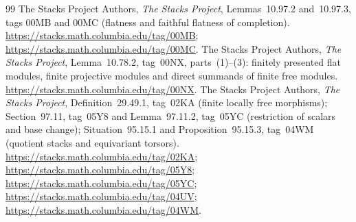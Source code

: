 \documentclass[11pt,a4paper]{article}
\theoremstyle{named}\newtheorem{finding}{Finding}[section]
\theoremstyle{definition}\newtheorem{definition}[finding]{Definition}
\theoremstyle{remark}\newtheorem{remark}[finding]{Remark}
\begin{document}
\begin{thebibliography}{99}
 The Stacks Project Authors,
\emph{The Stacks Project},
Lemmas~10.97.2 and~10.97.3, tags 00MB and 00MC
(flatness and faithful flatness of completion).
\url{https://stacks.math.columbia.edu/tag/00MB};
\url{https://stacks.math.columbia.edu/tag/00MC}.
 The Stacks Project Authors,
\emph{The Stacks Project}, Lemma~10.78.2, tag~00NX,
parts~(1)--(3): finitely presented flat modules,
finite projective modules and direct summands of
finite free modules.
\url{https://stacks.math.columbia.edu/tag/00NX}.
 The Stacks Project Authors,
\emph{The Stacks Project},
Definition~29.49.1, tag~02KA (finite locally free morphisms);
Section~97.11, tag~05Y8 and Lemma~97.11.2, tag~05YC
(restriction of scalars and base change);
Situation~95.15.1 and Proposition~95.15.3, tag~04WM
(quotient stacks and equivariant torsors).
\url{https://stacks.math.columbia.edu/tag/02KA};
\url{https://stacks.math.columbia.edu/tag/05Y8};
\url{https://stacks.math.columbia.edu/tag/05YC};
\url{https://stacks.math.columbia.edu/tag/04UV};
\url{https://stacks.math.columbia.edu/tag/04WM}.
\end{thebibliography}
\end{document}
